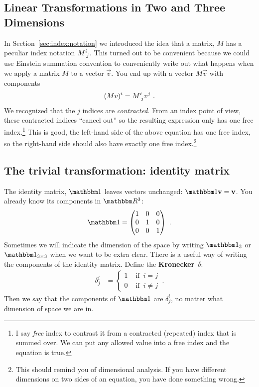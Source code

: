 \documentclass[12pt]{article}
\begin{document}
\subsection{Linear Transformations in Two and Three Dimensions}

In Section~\ref{sec:index:notation} we introduced the idea that a matrix, $M$ has a peculiar index notation $M\aij{i}{j}$. This turned out to be convenient because we could use Einstein summation convention to conveniently write out what happens when we apply a matrix $M$ to a vector $\vec{v}$. You end up with a vector $M\vec{v}$ with components
\begin{align}
    (Mv)^i = M\aij{i}{j}v^j \ .
\end{align}
We recognized that the $j$ indices are \emph{contracted}. From an index point of view, these contracted indices ``cancel out'' so the resulting expression  only has one free index.\footnote{I say \emph{free} index to contrast it from a contracted (repeated) index that is summed over. We can put any allowed value into a free index and the equation is true.} This is good, the left-hand side of the above equation has one free index, so the right-hand side should also have exactly one free index.\footnote{This should remind you of dimensional analysis. If you have different dimensions on two sides of an equation, you have done something wrong.}




\subsection{The trivial transformation: identity matrix}

The identity matrix, $\one $ leaves vectors unchanged: $\one \vec{v} = \vec{v}$. You already know its components in $\RR ^3$:
\begin{align}
    \one  = 
    \begin{pmatrix}
        1 & 0 & 0 \\
        0 & 1 & 0 \\
        0 & 0 & 1
    \end{pmatrix} \ .
\end{align}
Sometimes we will indicate the dimension of the space by writing $\one _3$ or $\one _{3\times 3}$ when we want to be extra clear. There is a useful way of writing the components of the identity matrix. Define the \textbf{Kronecker}~$\delta$: 
\begin{align}
    \delta^i_j &= 
    \begin{cases}
    1 & \text{ if }\, i=j\\
    0 & \text{ if }\, i\neq j
    \end{cases} \ .
\end{align}
Then we say that the components of $\one $ are $\delta^i_j$, no matter what dimension of space we are in.
\end{document}
